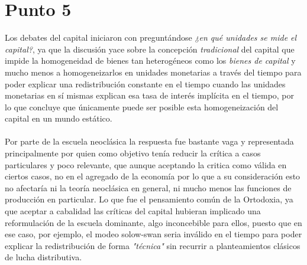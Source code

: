 \documentclass[11pt]{article}
\begin{document}
{\section{Punto 5}
\begin{flushleft}
    Los debates del capital iniciaron con \citet{robinson_1953} preguntándose \textit{¿en qué unidades se mide el capital?}, ya que la discusión yace sobre la concepción \textit{tradicional} del capital
    que impide la homogeneidad de bienes tan heterogéneos como los \textit{bienes de capital} y mucho menos a homogeneizarlos en unidades monetarias a través del tiempo para poder explicar una redistribución constante en el tiempo
    cuando las unidades monetarias en sí mismas explican esa tasa de interés implícita en el tiempo, por lo que concluye que únicamente puede ser posible esta homogeneización del capital en un mundo estático.
    \\~\\
    Por parte de la escuela neoclásica la respuesta fue bastante vaga y representada principalmente por \citet{samuelson_1962} quien como objetivo tenía reducir la crítica a casos particulares y poco relevante,
    que aunque aceptando la critica como válida en ciertos casos, no en el agregado de la economía por lo que a su consideración esto no afectaría ni la teoría neoclásica en general, ni mucho menos las funciones de producción en particular.
    Lo que fue el pensamiento común de la Ortodoxia, ya que aceptar a cabalidad las críticas del capital hubieran implicado una reformulación de la escuela dominante, algo inconcebible para ellos, puesto que
    en ese caso, por ejemplo, el modeo solow-swan seria inválido en el tiempo para poder explicar la redistribución de forma \textit{"técnica"} sin recurrir a planteamientos clásicos de lucha distributiva.\citep{lazzarini2013}\end{flushleft}

}
\end{document}
